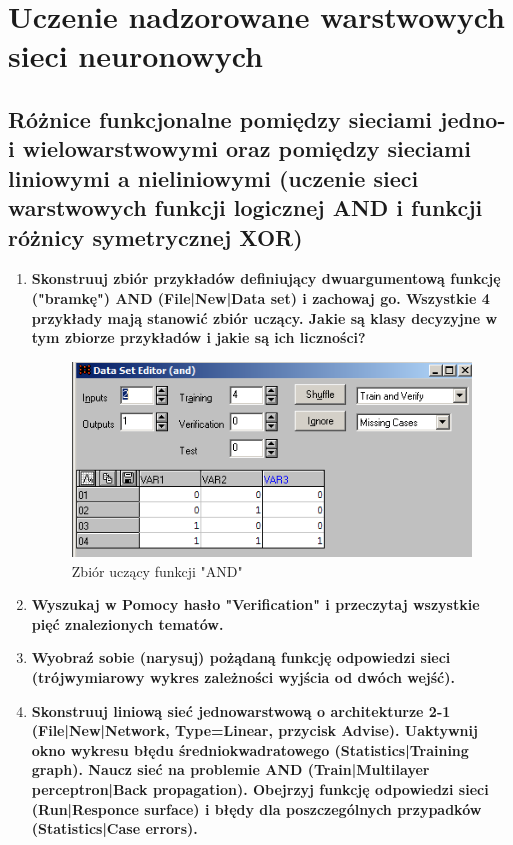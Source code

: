 
\section{Uczenie nadzorowane warstwowych sieci neuronowych}

\subsection{Różnice funkcjonalne pomiędzy sieciami jedno- i wielowarstwowymi oraz pomiędzy sieciami liniowymi a nieliniowymi (uczenie sieci warstwowych funkcji logicznej AND i funkcji różnicy symetrycznej XOR)}

\begin{enumerate}
\item \textbf{
Skonstruuj zbiór przykładów definiujący dwuargumentową funkcję ("bramkę") AND (File|New|Data set) i zachowaj go. Wszystkie 4 przykłady mają stanowić zbiór uczący. Jakie są klasy decyzyjne w tym zbiorze przykładów i jakie są ich liczności?}
\begin{figure}[h]
\centering
\includegraphics[scale=0.75]{dane/part1/zad2/dataset_and}
\caption{Zbiór uczący funkcji "AND"\label{fig:dataset_and}}
\end{figure}

\item \textbf{
Wyszukaj w Pomocy hasło "Verification" i przeczytaj wszystkie pięć znalezionych tematów.}

\item \textbf{
Wyobraź sobie (narysuj) pożądaną funkcję odpowiedzi sieci (trójwymiarowy wykres zależności wyjścia od dwóch wejść).}

\item \textbf{
Skonstruuj liniową sieć jednowarstwową o architekturze 2-1 (File|New|Network, Type=Linear, przycisk Advise). Uaktywnij okno wykresu błędu średniokwadratowego (Statistics|Training graph). Naucz sieć na problemie AND (Train|Multilayer perceptron|Back propagation). Obejrzyj funkcję odpowiedzi sieci (Run|Responce surface) i błędy dla poszczególnych przypadków (Statistics|Case errors).}
 

\end{enumerate}
